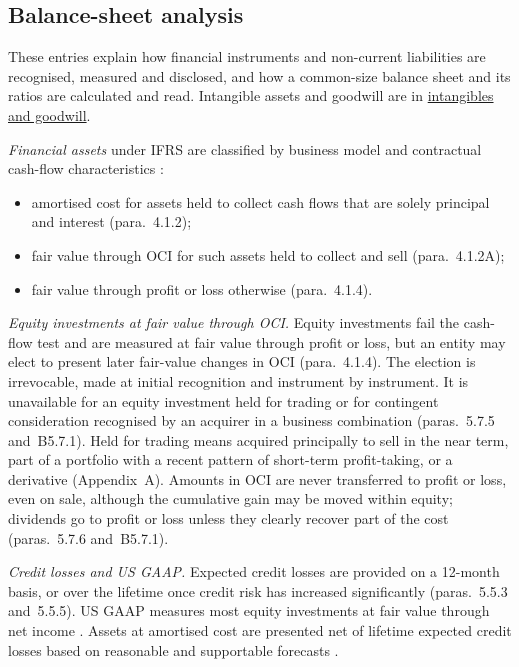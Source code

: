 \subsection{Balance-sheet analysis}

These entries explain how financial instruments and non-current liabilities are recognised, measured and disclosed, and how a common-size balance sheet and its ratios are calculated and read. Intangible assets and goodwill are in \hyperref[meth:intangibles-goodwill-reporting]{intangibles and goodwill}.

\begin{qfmethod}\label{meth:financial-instruments-liabilities}
 \emph{Financial assets} under IFRS are classified by business model and contractual cash-flow characteristics \citep[IFRS~9 para.~4.1.1]{eu-2023-1803-ifrs9}:
\begin{itemize}
\item amortised cost for assets held to collect cash flows that are solely principal and interest (para.~4.1.2);
\item fair value through OCI for such assets held to collect and sell (para.~4.1.2A);
\item fair value through profit or loss otherwise (para.~4.1.4).
\end{itemize}
\emph{Equity investments at fair value through OCI.} Equity investments fail the cash-flow test and are measured at fair value through profit or loss, but an entity may elect to present later fair-value changes in OCI (para.~4.1.4). The election is irrevocable, made at initial recognition and instrument by instrument. It is unavailable for an equity investment held for trading or for contingent consideration recognised by an acquirer in a business combination (paras.~5.7.5 and~B5.7.1). Held for trading means acquired principally to sell in the near term, part of a portfolio with a recent pattern of short-term profit-taking, or a derivative (Appendix~A). Amounts in OCI are never transferred to profit or loss, even on sale, although the cumulative gain may be moved within equity; dividends go to profit or loss unless they clearly recover part of the cost (paras.~5.7.6 and~B5.7.1).

\emph{Credit losses and US GAAP.} Expected credit losses are provided on a 12-month basis, or over the lifetime once credit risk has increased significantly (paras.~5.5.3 and~5.5.5). US GAAP measures most equity investments at fair value through net income \citep[p.~1]{us-equity-investments-2016}. Assets at amortised cost are presented net of lifetime expected credit losses based on reasonable and supportable forecasts \citep[p.~2]{us-credit-losses-2016}.


\end{qfmethod}
